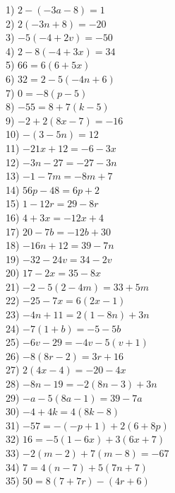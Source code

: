 \documentclass[12pt]{article}
\theoremstyle{definition}
\begin{document}
\begin{multicols}{2}
  1) $2 - (- 3 a - 8) = 1$\\
  2) $2 (- 3 n + 8) = - 20$\\
  3) $- 5 (- 4 + 2 v) = - 50$\\
  4) $2 - 8 (- 4 + 3 x) = 34$\\
  5) $66 = 6 (6 + 5 x) $\\
	6) $32 = 2 - 5 (- 4 n + 6)$\\
  7) $0 = - 8 (p - 5)$\\
  8) $- 55 = 8 + 7 (k - 5)$\\
  9) $- 2 + 2 (8 x - 7) = - 16$\\
  10) $- (3 - 5 n) = 12$\\
  11) $- 21 x + 12 = - 6 - 3 x$\\
  12) $- 3 n - 27 = - 27 - 3 n$\\
  13) $- 1 - 7 m = - 8 m + 7$\\
  14) $56 p - 48 = 6 p + 2$\\
  15) $1 - 12 r = 29 - 8 r$\\
  16) $4 + 3 x = - 12 x + 4$\\
  17) $20 - 7 b = - 12 b + 30$\\
  18) $- 16 n + 12 = 39 - 7 n$\\
  19) $- 32 - 24 v = 34 - 2 v$\\
  20) $17 - 2 x = 35 - 8 x$\\
  21) $- 2 - 5 (2 - 4 m) = 33 + 5 m$\\
  22) $- 25 - 7 x = 6 (2 x - 1)$\\
  23) $- 4 n + 11 = 2 (1 - 8 n) + 3 n$\\
  24) $- 7 (1 + b) = - 5 - 5 b$\\
  25) $- 6 v - 29 = - 4 v - 5 (v + 1) $\\
  26) $- 8 (8 r - 2) = 3 r + 16$\\
  27) $2 (4 x - 4) = - 20 - 4 x$\\
  28) $- 8 n - 19 = - 2 (8 n - 3) + 3 n$\\
  29) $- a - 5 (8 a - 1) = 39 - 7 a$\\
  30) $- 4 + 4 k = 4 (8 k - 8)$\\
  31) $- 57 = - (- p + 1) + 2 (6 + 8 p)$\\
  32) $16 = - 5 (1 - 6 x) + 3 (6 x + 7)$\\
  33) $- 2 (m - 2) + 7 (m - 8) = - 67$\\
  34) $7 = 4 (n - 7) + 5 (7 n + 7)$\\
  35) $50 = 8 (7 + 7 r) - (4 r + 6)$\\

\end{multicols}
\end{document}
